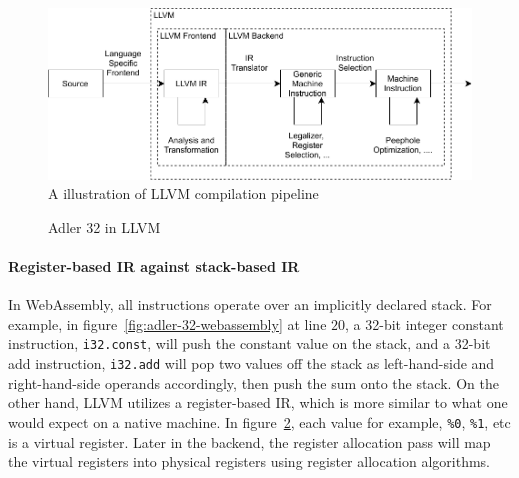 \begin{figure}
  \centering
  \includegraphics{Images/llvm-intro.pdf}
  \caption{A illustration of LLVM compilation pipeline}
  \label{fig:llvm-intro}
\end{figure}

\begin{figure}
  \centering
  
  \caption{Adler 32 in LLVM}
  \label{fig:adler-32-llvm}
\end{figure}

\paragraph{Register-based IR against stack-based IR}
In WebAssembly, all instructions operate over an implicitly declared stack. For
example, in figure~\ref{fig:adler-32-webassembly} at line $20$, a 32-bit integer
constant instruction, \texttt{i32.const}, will push the constant value on the
stack, and a 32-bit add instruction, \texttt{i32.add} will pop two values off
the stack as left-hand-side and right-hand-side operands accordingly, then push
the sum onto the stack. On the other hand, LLVM utilizes a register-based IR,
which is more similar to what one would expect on a native machine. In
figure~\ref{fig:adler-32-llvm}, each value for example, \texttt{\%0},
\texttt{\%1}, etc is a virtual register. Later in the backend, the register
allocation pass will map the virtual registers into physical registers using
register allocation algorithms.

